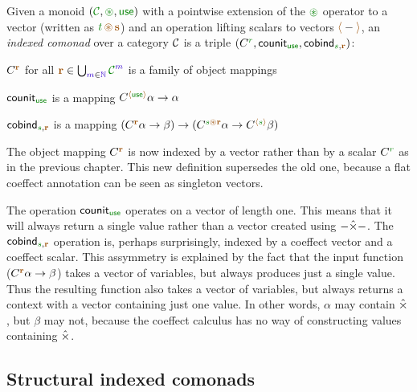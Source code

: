 \begin{definition}
Given a monoid $(\C, \cseq, \cunit)$ with a pointwise extension of the $\cseq$ operator to a vector 
(written as $\cclrd{t}\,\aseq\,\aclrd{\textbf{s}}$) and an operation lifting scalars to vectors 
$\alift{-}$, an \emph{indexed comonad} over a category $\mathcal{C}$ is a triple 
$(\ctyp{\cclrd{r}{}}, \ident{counit}_{\cunit}, \ident{cobind}_{\cclrd{s}, \aclrd{\textbf{r}}})$:

\begin{compactitem}
\item $\ctyp{\aclrd{\textbf{r}}}{}$ for all $\aclrd{\textbf{r}} \in \bigcup_{\sclrd{m}\in \sclrd{\mathbb{N}}} \C^{\sclrd{m}}$ is a family of object mappings 
\item $\ident{counit}_{\cunit}$ is a mapping $\ctyp{\alift{\cunit}}{\alpha} \rightarrow \alpha$ 
\item $\ident{cobind}_{\cclrd{s}, \aclrd{\textbf{r}}}$ is a mapping $(\ctyp{\aclrd{\textbf{r}}}{\alpha} \rightarrow \beta) 
  \rightarrow (\ctyp{\cclrd{s}\aseq\aclrd{\textbf{r}}}{\alpha} \rightarrow \ctyp{\alift{\cclrd{s}}}{\beta})$
\end{compactitem}
\end{definition}

\noindent
The object mapping $\ctyp{\aclrd{\textbf{r}}}$ is now indexed by a vector rather than by a scalar 
$\ctyp{\cclrd{r}}$ as in the previous chapter. This new definition supersedes the old one, because a 
flat coeffect annotation can be seen as singleton vectors.

The operation $\ident{counit}_{\cunit}$ operates on a vector of length one. This means that it will always
return a single value rather than a vector created using $-\hat{\times}-$. The $\ident{cobind}_{\cclrd{s}, \aclrd{\textbf{r}}}$
operation is, perhaps surprisingly, indexed by a coeffect vector and a coeffect scalar. This assymmetry
is explained by the fact that the input function ($\ctyp{\aclrd{\textbf{r}}}{\alpha} \rightarrow \beta$)
takes a vector of variables, but always produces just a single value. Thus the resulting function 
also takes a vector of variables, but always returns a context with a vector containing just one value.
In other words, $\alpha$ may contain $\hat{\times}$, but $\beta$ may not, because the coeffect calculus has
no way of constructing values containing $\hat{\times}$.


\subsection{Structural indexed comonads}

